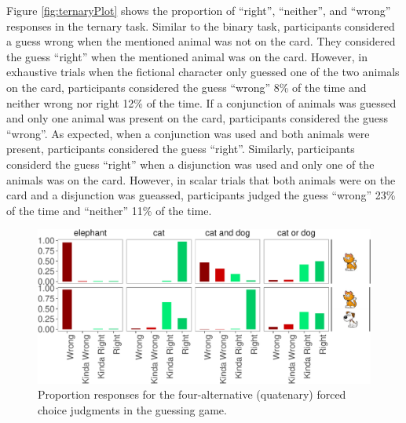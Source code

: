 \documentclass[floatsintext,man]{apa6}
\theoremstyle{definition}
\theoremstyle{definition}
\theoremstyle{definition}
\theoremstyle{remark}
\begin{document}
Figure \ref{fig:ternaryPlot} shows the proportion of \enquote{right},
\enquote{neither}, and \enquote{wrong} responses in the ternary task.
Similar to the binary task, participants considered a guess wrong when
the mentioned animal was not on the card. They considered the guess
\enquote{right} when the mentioned animal was on the card. However, in
exhaustive trials when the fictional character only guessed one of the
two animals on the card, participants considered the guess
\enquote{wrong} 8\% of the time and neither wrong nor right 12\% of the
time. If a conjunction of animals was guessed and only one animal was
present on the card, participants considered the guess \enquote{wrong}.
As expected, when a conjunction was used and both animals were present,
participants considered the guess \enquote{right}. Similarly,
participants considerd the guess \enquote{right} when a disjunction was
used and only one of the animals was on the card. However, in scalar
trials that both animals were on the card and a disjunction was
gueassed, participants judged the guess \enquote{wrong} 23\% of the time
and \enquote{neither} 11\% of the time.

\begin{figure}[t]

{\centering \includegraphics{writeup_files/figure-latex/quaternaryPlot-1} 

}

\caption{Proportion responses for the four-alternative (quatenary) forced choice judgments in the guessing game.}\label{fig:quaternaryPlot}
\end{figure}
\end{document}
